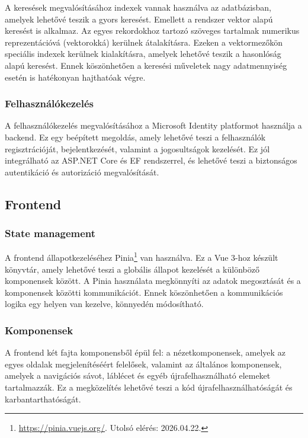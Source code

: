 A keresések megvalósításához indexek vannak használva az adatbázisban, amelyek lehetővé teszik a gyors keresést. Emellett a rendszer vektor alapú keresést is alkalmaz. Az egyes rekordokhoz tartozó szöveges tartalmak numerikus reprezentációvá (vektorokká) kerülnek átalakításra. Ezeken a vektormezőkön speciális indexek kerülnek kialakításra, amelyek lehetővé teszik a hasonlóság alapú keresést.
Ennek köszönhetően a keresési műveletek nagy adatmennyiség esetén is hatékonyan hajthatóak végre.

\subsubsection{Felhasználókezelés}

A felhasználókezelés megvalósításához a Microsoft Identity platformot használja a backend. Ez egy beépített megoldás, amely lehetővé teszi a felhasználók regisztrációját, bejelentkezését, valamint a jogosultságok kezelését. Ez jól integrálható az ASP.NET Core és EF rendszerrel, és lehetővé teszi a biztonságos autentikáció és autorizáció megvalósítását. 


\subsection{Frontend}

\subsubsection{State management}

A frontend állapotkezeléséhez Pinia\footnote{\url{https://pinia.vuejs.org/}. Utolsó elérés: 2026.04.22.} van használva. Ez a Vue 3-hoz készült könyvtár, amely lehetővé teszi a globális állapot kezelését a különböző komponensek között. A Pinia használata megkönnyíti az adatok megosztását és a komponensek közötti kommunikációt. Ennek köszönhetően a kommunikációs logika egy helyen van kezelve, könnyedén módosítható.

\subsubsection{Komponensek}

A frontend két fajta komponensből épül fel: a nézetkomponensek, amelyek az egyes oldalak megjelenítéséért felelősek, valamint az általános komponensek, amelyek a navigációs sávot, láblécet és egyéb újrafelhasználható elemeket tartalmazzák. Ez a megközelítés lehetővé teszi a kód újrafelhasználhatóságát és karbantarthatóságát.

